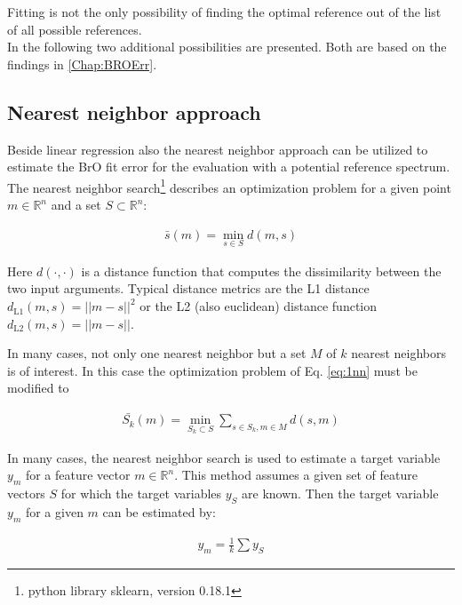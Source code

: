 \documentclass  [
  paper    = a4,
  BCOR     = 10mm,
  twoside,
  fontsize = 12pt,
  fleqn,
  toc      = bibnumbered,
  toc      = listofnumbered,
  numbers  = noendperiod,
  headings = normal,
  listof   = leveldown,
  version  = 3.03
]                                       {scrreprt}
\begin{document}
Fitting is not the only possibility of finding the optimal reference out of the list of all possible references.\\
In the following two additional possibilities are presented. Both are based on the findings in \cref{Chap:BROErr}. 

\subsection{Nearest neighbor approach}


Beside linear regression also the nearest neighbor approach can be utilized to estimate the BrO fit error for the evaluation with a potential reference spectrum.
%
The nearest neighbor search\footnote{python library sklearn, version 0.18.1} describes an optimization problem for a given point $m \in \mathbb{R}^n$ and a set $S \subset \mathbb{R}^n$:

%

\begin{align}
\bar{s}(m) = \min_{s \in S} d(m, s) \label{eq:1nn}
\end{align}

%
Here $d(\cdot, \cdot)$ is a distance function that computes the dissimilarity between the two input arguments. Typical distance metrics are the L1 distance $d_{\text{L1}     
}(m, s) = ||m - s||^2$ or the L2 (also euclidean) distance function $d_{\text{L2} 
}(m, s) = ||m - s||$. 


In many cases, not only one nearest neighbor but a set $M$ of $k$ nearest neighbors is of interest. In this case the optimization problem of Eq. \ref{eq:1nn} must be modified to

%

\begin{align}
\bar{S_k}(m) = \min_{S_k \subset S} \sum_{s \in S_k, m \in M} d(s, m) \label{eq:knn}
\end{align}

%

In many cases, the nearest neighbor search is used to estimate a target variable $y_m$ for a feature vector $m \in \mathbb{R}^n$. This method assumes a given set of feature vectors $S$ for which the target variables $y_S$ are known. Then the target variable $y_m$ for a given $m$ can be estimated by:

%

\begin{align}
y_m = \frac{1}{k} \sum y_S \label{eq:knn_regression}
\end{align}
\end{document}
